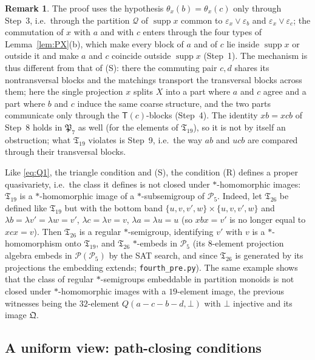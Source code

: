 \documentclass[11pt]{amsart}
\theoremstyle{definition}
\newtheorem{remark}[theorem]{Remark}
\renewcommand{\P}{\mathcal{P}}
\newcommand{\supp}{\operatorname{supp}}
\newcommand{\T}{\mathsf{T}}
\begin{document}
\begin{remark}\label{rem:Rproof}
The proof uses the hypothesis $\theta_x(b)=\theta_x(c)$ only through Step~3, i.e.\ through the partition $\mathcal Q$ of $\supp x$ common to $\varepsilon_x\vee\varepsilon_b$ and $\varepsilon_x\vee\varepsilon_c$; the commutation of $x$ with $a$ and with $c$ enters through the four types of Lemma~\ref{lem:PX}(b), which make every block of $a$ and of $c$ lie inside $\supp x$ or outside it and make $a$ and $c$ coincide outside $\supp x$ (Step~1). The mechanism is thus different from that of (S): there the commuting pair $c,d$ shares its nontransversal blocks and the matchings transport the transversal blocks across them; here the single projection $x$ splits $X$ into a part where $a$ and $c$ agree and a part where $b$ and $c$ induce the same coarse structure, and the two parts communicate only through the $\T(c)$-blocks (Step~4). The identity $xb=xcb$ of Step~8 holds in $\mathfrak P_7$ as well (for the elements of $\mathfrak T_{19}$), so it is not by itself an obstruction; what $\mathfrak T_{19}$ violates is Step~9, i.e.\ the way $ab$ and $ucb$ are compared through their transversal blocks.


Like \eqref{eq:Q1}, the triangle condition and (S), the condition (R) defines a proper quasivariety, i.e.\ the class it defines is not closed under $*$-homomorphic images: $\mathfrak T_{19}$ is a $*$-homomorphic image of a $*$-subsemigroup of $\P_5$. Indeed, let $\mathfrak T_{26}$ be defined like $\mathfrak T_{19}$ but with the bottom band $\{u,v,v',w\}\times\{u,v,v',w\}$ and $\lambda b=\lambda v'=\lambda w=v'$, $\lambda c=\lambda v=v$, $\lambda a=\lambda u=u$ (so $xbx=v'$ is no longer equal to $xcx=v$). Then $\mathfrak T_{26}$ is a regular $*$-semigroup, identifying $v'$ with $v$ is a $*$-homomorphism onto $\mathfrak T_{19}$, and $\mathfrak T_{26}$ $*$-embeds in $\P_5$ (its $8$-element projection algebra embeds in $\P(\P_5)$ by the SAT search, and since $\mathfrak T_{26}$ is generated by its projections the embedding extends; \texttt{fourth\_pre.py}). The same example shows that the class of regular $*$-semigroups embeddable in partition monoids is not closed under $*$-homomorphic images with a $19$-element image, the previous witnesses being the $32$-element $Q(a-c-b-d,\bot)$ with $\bot$ injective and its image $\mathfrak Q$.
\end{remark}

\subsection{A uniform view: path-closing conditions}\label{subsec:pathclose}
\end{document}
